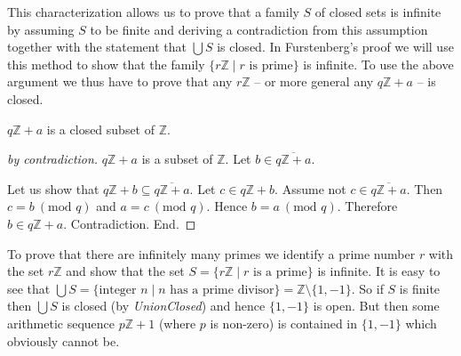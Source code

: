 \documentclass[english]{article}
\renewcommand{\mod}{\text{mod }}
\newcommand{\Int}{\mathbb{Z}}
\begin{document}
  This characterization allows us to prove that a family $S$ of closed sets is infinite by assuming
  $S$ to be finite and deriving a contradiction from this assumption together with the statement
  that $\bigcup S$ is closed. In Furstenberg's proof we will use this method to show that the family
  $\{ r \Int \mid r \text{ is prime} \}$ is infinite. To use the above argument we thus have to
  prove that any $r \Int$ -- or more general any $q \Int + a$ -- is closed.

  \begin{forthel}
    \begin{lemma}\label{ArSeqClosed}
      $q \Int + a$ is a closed subset of $\Int$.
    \end{lemma}
    \begin{proof}[by contradiction]
      $q \Int + a$ is a subset of $\Int$.
      Let $b \in \overline{q \Int + a}$.

      Let us show that $q \Int + b \subseteq \overline{q \Int + a}$.
        Let $c \in q \Int + b$.
        Assume not $c \in \overline{q \Int + a}$.
        Then $c = b ~(\mod q)$ and $a = c ~(\mod q)$.
        Hence $b = a ~(\mod q)$.
        Therefore $b \in q \Int + a$.
        Contradiction.
      End.
    \end{proof}
  \end{forthel}

  To prove that there are infinitely many primes we identify a prime number $r$ with the set
  $r \Int$ and show that the set $S = \{r \Int \mid r \textrm{ is a prime} \}$ is infinite. It is
  easy to see that $\bigcup S = \{ \text{integer } n \mid n \text{ has a prime divisor} \} =
  \Int \setminus \{ 1, -1 \}$. So if $S$ is finite then $\bigcup S$ is closed
  (by \textit{UnionClosed}) and hence $\{ 1, -1 \}$ is open. But then some arithmetic sequence
  $p \Int + 1$ (where $p$ is non-zero) is contained in $\{ 1, -1 \}$ which obviously cannot be.
\end{document}
